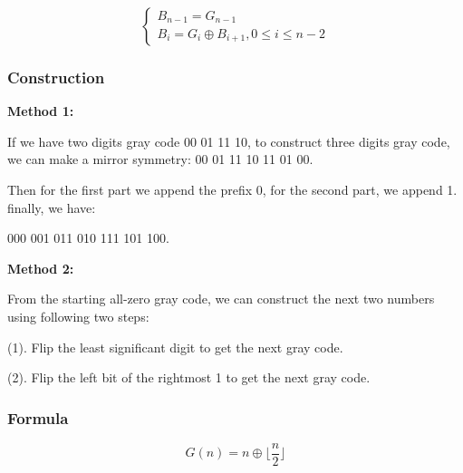 \documentclass{article}
\begin{document}
      \begin{equation*}
        \begin{cases}
          B_{n-1} = G_{n-1} \\
          B_{i} = G_{i} \oplus B_{i+1}, 0 \leq i \leq n - 2
        \end{cases}
      \end{equation*}

    \subsubsection{Construction}
      \textbf{Method 1:} \par
      If we have two digits gray code 00 01 11 10, to construct three digits gray code,
      we can make a mirror symmetry: 00 01 11 10 \vline {} 11 01 00.

      \smallskip 

      Then for the first part we append the prefix 0, for the second part, we append 1. finally, we have: \par
      000 001 011 010 \vline {} 111 101 100.

      \bigskip

      \textbf{Method 2:} \par
      From the starting all-zero gray code, we can construct the next two numbers using following two steps:

      \smallskip
      
      (1). Flip the least significant digit to get the next gray code. \par
      (2). Flip the left bit of the rightmost 1 to get the next gray code. 
    
    \subsubsection{Formula}
      \begin{equation*}
        G(n) = n \oplus \lfloor{\frac{n}{2}}\rfloor
      \end{equation*}
\end{document}
